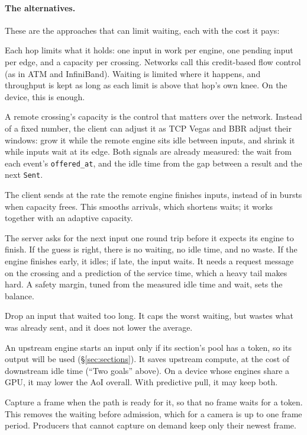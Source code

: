 \documentclass[11pt]{article}
\newcommand{\code}[1]{\texttt{#1}}
\begin{document}
\paragraph{The alternatives.} These are the approaches that can limit
waiting, each with the cost it pays:
\begin{description}[style=nextline, leftmargin=1.5em, nosep]
  \item[Per-hop limits (today, under the tokens)] Each hop limits what it
        holds: one input in work per engine, one pending input per edge, and
        a capacity per crossing. Networks call this credit-based flow control
        (as in ATM and InfiniBand). Waiting is limited where it happens, and
        throughput is kept as long as each limit is above that hop's own
        knee. On the device, this is enough.
  \item[Adaptive crossing capacity] A remote crossing's capacity is the
        control that matters over the network. Instead of a fixed number, the
        client can adjust it as TCP Vegas and BBR adjust their windows: grow
        it while the remote engine sits idle between inputs, and shrink it
        while inputs wait at its edge. Both signals are already measured: the
        wait from each event's \code{offered\_at}, and the idle time from the
        gap between a result and the next \code{Sent}.
  \item[Pacing] The client sends at the rate the remote engine finishes
        inputs, instead of in bursts when capacity frees. This smooths
        arrivals, which shortens waits; it works together with an adaptive
        capacity.
  \item[Predictive pull] The server asks for the next input one round trip
        before it expects its engine to finish. If the guess is right, there
        is no waiting, no idle time, and no waste. If the engine finishes
        early, it idles; if late, the input waits. It needs a request message
        on the crossing and a prediction of the service time, which a heavy
        tail makes hard. A safety margin, tuned from the measured idle time
        and wait, sets the balance.
  \item[Age limit (optional today)] Drop an input that waited too long. It
        caps the worst waiting, but wastes what was already sent, and it does
        not lower the average.
  \item[Gating on downstream readiness (planned, as sections)] An
        upstream engine starts an input only if its section's pool has a
        token, so its output will be used (\S\ref{sec:sections}). It saves
        upstream compute, at the cost of downstream idle time (``Two goals''
        above). On a device whose engines share a GPU, it may lower the AoI
        overall. With predictive pull, it may keep both.
  \item[On-demand producers] Capture a frame when the path is ready for it,
        so that no frame waits for a token. This removes the waiting before
        admission, which for a camera is up to one frame period. Producers
        that cannot capture on demand keep only their newest frame.
\end{description}
\end{document}
